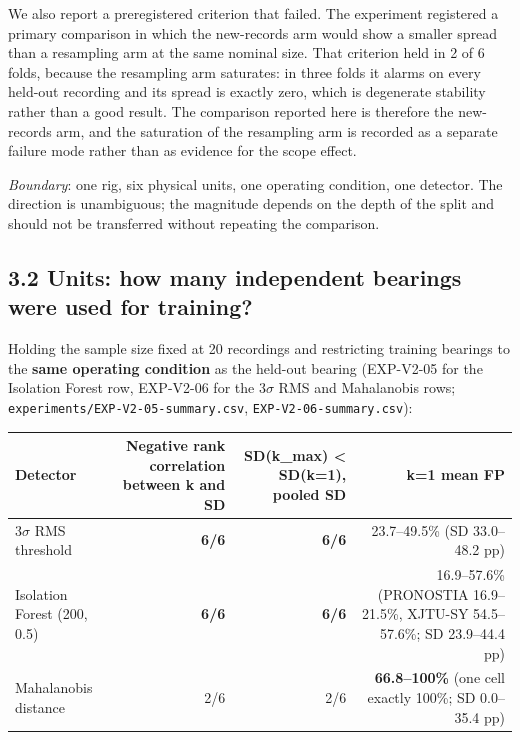 \documentclass[11pt]{article}
\newcommand{\code}[1]{\texttt{#1}}
\begin{document}
We also report a preregistered criterion that failed. The experiment registered a primary comparison in which the new-records arm would show a smaller spread than a resampling arm at the same nominal size. That criterion held in 2 of 6 folds, because the resampling arm saturates: in three folds it alarms on every held-out recording and its spread is exactly zero, which is degenerate stability rather than a good result. The comparison reported here is therefore the new-records arm, and the saturation of the resampling arm is recorded as a separate failure mode rather than as evidence for the scope effect.

\emph{Boundary}: one rig, six physical units, one operating condition, one detector. The direction is unambiguous; the magnitude depends on the depth of the split and should not be transferred without repeating the comparison.

\subsection{3.2 Units: how many independent bearings were used for training?}

Holding the sample size fixed at 20 recordings and restricting training bearings to the \textbf{same operating condition} as the held-out bearing (EXP-V2-05 for the Isolation Forest row, EXP-V2-06 for the 3$\sigma$ RMS and Mahalanobis rows; \code{experiments/EXP-V2-05-summary.csv}, \code{EXP-V2-06-summary.csv}):

\begin{table}[t]
\centering
\small
\begin{tabular}{lrrr}
\toprule
Detector & Negative rank correlation between k and SD & SD(k\_max) < SD(k=1), pooled SD & k=1 mean FP \\
\midrule
3$\sigma$ RMS threshold & \textbf{6/6} & \textbf{6/6} & 23.7--49.5\% (SD 33.0--48.2 pp) \\
Isolation Forest (200, 0.5) & \textbf{6/6} & \textbf{6/6} & 16.9--57.6\% (PRONOSTIA 16.9--21.5\%, XJTU-SY 54.5--57.6\%; SD 23.9--44.4 pp) \\
Mahalanobis distance & 2/6 & 2/6 & \textbf{66.8--100\%} (one cell exactly 100\%; SD 0.0--35.4 pp) \\
\bottomrule
\end{tabular}
\end{table}
\end{document}
